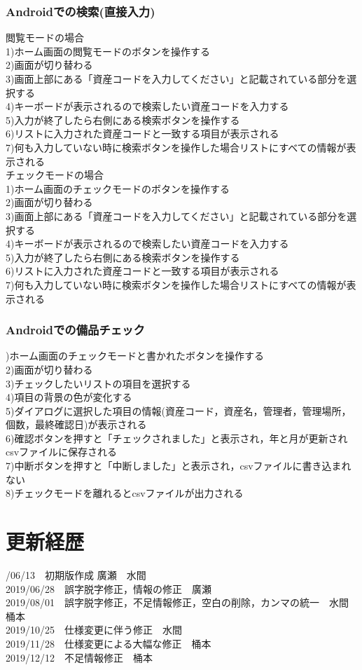 \documentclass[11pt,a4j]{jarticle}
\begin{document}
\subsubsection{Androidでの検索(直接入力)}
\noindent
{閲覧モードの場合}
\\1)ホーム画面の閲覧モードのボタンを操作する
\\2)画面が切り替わる
\\3)画面上部にある「資産コードを入力してください」と記載されている部分を選択する
\\4)キーボードが表示されるので検索したい資産コードを入力する
\\5)入力が終了したら右側にある検索ボタンを操作する
\\6)リストに入力された資産コードと一致する項目が表示される
\\7)何も入力していない時に検索ボタンを操作した場合リストにすべての情報が表示される
\noindent
\\
{チェックモードの場合}
\\1)ホーム画面のチェックモードのボタンを操作する
\\2)画面が切り替わる
\\3)画面上部にある「資産コードを入力してください」と記載されている部分を選択する
\\4)キーボードが表示されるので検索したい資産コードを入力する
\\5)入力が終了したら右側にある検索ボタンを操作する
\\6)リストに入力された資産コードと一致する項目が表示される
\\7)何も入力していない時に検索ボタンを操作した場合リストにすべての情報が表示される

\subsubsection{Androidでの備品チェック}
)ホーム画面のチェックモードと書かれたボタンを操作する
\\2)画面が切り替わる
\\3)チェックしたいリストの項目を選択する
\\4)項目の背景の色が変化する
\\5)ダイアログに選択した項目の情報(資産コード，資産名，管理者，管理場所，個数，最終確認日)が表示される
\\6)確認ボタンを押すと「チェックされました」と表示され，年と月が更新されcsvファイルに保存される
\\7)中断ボタンを押すと「中断しました」と表示され，csvファイルに書き込まれない
\\8)チェックモードを離れるとcsvファイルが出力される

  \newpage
  \section{更新経歴}
  /06/13　初期版作成	廣瀬　水間
  \\2019/06/28　誤字脱字修正，情報の修正　廣瀬
  \\2019/08/01　誤字脱字修正，不足情報修正，空白の削除，カンマの統一　水間　桶本
  \\2019/10/25　仕様変更に伴う修正　水間
　\\2019/11/28　仕様変更による大幅な修正　桶本
　\\2019/12/12　不足情報修正　桶本
\end{document}
